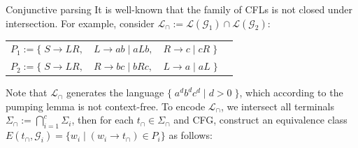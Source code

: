 \documentclass{beamer}
\begin{document}
    \begin{frame}[fragile]{Conjunctive parsing}
        It is well-known that the family of CFLs is not closed under intersection. For example, consider $\mathcal{L}_\cap := \mathcal{L}(\mathcal{G}_1) \cap \mathcal{L}(\mathcal{G}_2)$:

        \begin{table}[H]
            \begin{tabular}{llll}
                $P_1 := \big\{\;S \rightarrow L R,$ & $L \rightarrow a b \mid a L b,$ & $R \rightarrow c \mid c R\;\big\}$\vspace{5pt}\\
                $P_2 := \big\{\;S \rightarrow L R,$ & $R \rightarrow b c \mid b R c,$ & $L \rightarrow a \mid a L\;\big\}$
            \end{tabular}
        \end{table}

        \noindent Note that $\mathcal{L}_\cap$ generates the language $\big\{\;a^d b^d c^d \mid d > 0\;\big\}$, which according to the pumping lemma is not context-free. To encode $\mathcal{L}_\cap$, we intersect all terminals $\Sigma_\cap := \bigcap_{i=1}^c \Sigma_i$, then for each $t_\cap \in \Sigma_\cap$ and CFG, construct an equivalence class $E(t_\cap, \mathcal{G}_i) = \{ w_i \mid (w_i \rightarrow t_\cap) \in P_i\}$ as follows:\vspace{-5pt}


\end{frame}
\end{document}

